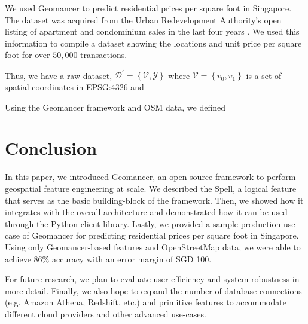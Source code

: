 \documentclass{article}
\begin{document}
We used Geomancer to predict residential prices per square foot in Singapore. 
The dataset was acquired from the Urban Redevelopment Authority's
open listing of apartment and condominium sales in the last
four years \cite{ura2019property}. We used this information to compile a
dataset showing the locations and unit price per square foot for over $50,000$
transactions.

Thus, we have a raw dataset, $\mathcal{D}^{\prime} = \left\{\mathcal{V},
\mathcal{Y}\right\}$ where $\mathcal{V} = \left\{v_0, v_1 \right\}$ is a set of
spatial coordinates in EPSG:4326 \cite{WGS84EPS46:online} and 

Using the Geomancer framework and OSM data, we defined 


\section{Conclusion}

In this paper, we introduced Geomancer, an open-source framework to perform
geospatial feature engineering at scale. We described the Spell, a logical
feature that serves as the basic building-block of the framework. Then, we
showed how it integrates with the overall architecture and demonstrated how it
can be used through the Python client library. Lastly, we provided a sample
production use-case of Geomancer for predicting residential prices per square
foot in Singapore. Using only Geomancer-based features and OpenStreetMap data,
we were able to achieve $86\%$ accuracy with an error margin of SGD 100. 

For future research, we plan to evaluate user-efficiency and system robustness
in more detail. Finally, we also hope to expand the number of database
connections (e.g. Amazon Athena, Redshift, etc.) and primitive features to
accommodate different cloud providers and other advanced use-cases.
 


\end{document}
